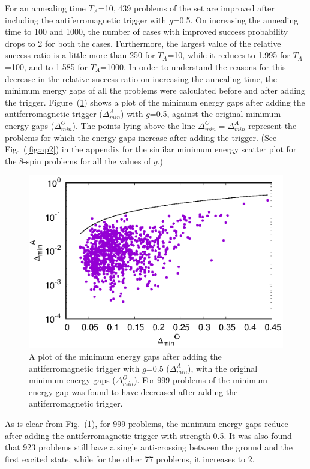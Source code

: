 \documentclass[../main.tex]{subfiles}
\begin{document}
For an annealing time $T_A$=10, 439 problems of the set are improved after including the antiferromagnetic trigger with $g$=0.5. On increasing the annealing time to 100 and 1000, the number of cases with improved success probability drops to 2 for both the cases. Furthermore, the largest value of the relative success ratio is a little more than 250 for $T_A$=10, while it reduces to 1.995 for $T_A$=100, and to 1.585 for $T_A$=1000. In order to understand the reasons for this decrease in the relative success ratio on increasing the annealing time, the minimum energy gaps of all the problems were calculated before and after adding the trigger. Figure~(\ref{fig:a13}) shows a plot of the minimum energy gaps after adding the antiferromagnetic trigger ($\Delta_{min}^A$) with $g$=0.5, against the original minimum energy gaps ($\Delta_{min}^O$). The points lying above the line $\Delta_{min}^O=\Delta_{min}^A$ represent the problems for which the energy gaps increase after adding the trigger. (See Fig.~(\ref{fig:ap2}) in the appendix for the similar minimum energy scatter plot for the 8-spin problems for all the values of $g$.)
\begin{figure}[H]
\centering 
\includegraphics[scale=0.8]{MinGap_A_g0.eps}
\caption{A plot of the minimum energy gaps after adding the antiferromagnetic trigger with $g$=0.5 ($\Delta_{min}^A$), with the original minimum energy gaps ($\Delta_{min}^O$). For 999 problems of the minimum energy gap was found to have decreased after adding the antiferromagnetic trigger.}
\label{fig:a13}
\end{figure}
As is clear from Fig.~(\ref{fig:a13}), for 999 problems, the minimum energy gaps reduce after adding the antiferromagnetic trigger with strength 0.5. It was also found that 923 problems still have a single anti-crossing between the ground and the first excited state, while for the other 77 problems, it increases to 2.\\
\end{document}
